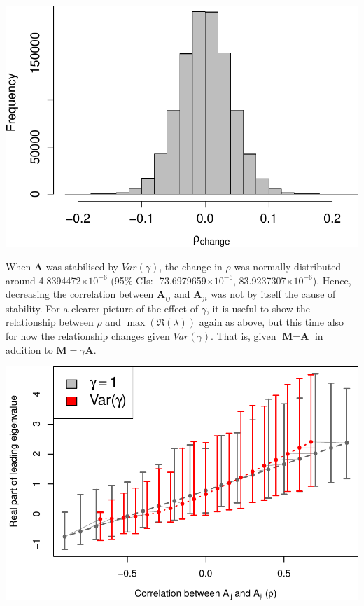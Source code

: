 \documentclass[]{article}
\begin{document}
\includegraphics{revision_notes_files/figure-latex/unnamed-chunk-7-1.pdf}

When \(\textbf{A}\) was stabilised by \(Var(\gamma)\), the change in
\(\rho\) was normally distributed around 4.8394472\(\times 10^{-6}\)
(95\% CIs: -73.6979659\(\times 10^{-6}\), 83.9237307\(\times 10^{-6}\)).
Hence, decreasing the correlation between \(\textbf{A}_{ij}\) and
\(\textbf{A}_{ji}\) was not by itself the cause of stability. For a
clearer picture of the effect of \(\gamma\), it is useful to show the
relationship between \(\rho\) and \(\max(\Re(\lambda))\) again as above,
but this time also for how the relationship changes given
\(Var(\gamma)\). That is, given \(\textbf{M} = \textbf{A}\) in addition
to \(\textbf{M} = \gamma\textbf{A}\).

\includegraphics{revision_notes_files/figure-latex/unnamed-chunk-8-1.pdf}
\end{document}
